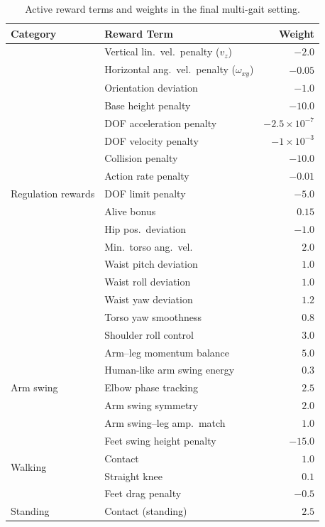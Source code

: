 \documentclass[letterpaper, 10 pt, conference]{ieeeconf}
\renewcommand{\arraystretch}{1.2}
\begin{document}
\begin{table}[h]
\centering
\caption{Active reward terms and weights in the final multi-gait setting.}
\label{tab:rewardweights}
\setlength{\tabcolsep}{6pt}
\renewcommand{\arraystretch}{1.05}
\begin{tabular}{llr}
\toprule
\textbf{Category} & \textbf{Reward Term} & \textbf{Weight} \\
\midrule
\multirow{17}{*}{Regulation rewards} 
& Vertical lin.\ vel.\ penalty ($v_z$) & $-2.0$ \\
& Horizontal ang.\ vel.\ penalty ($\omega_{xy}$) & $-0.05$ \\
& Orientation deviation & $-1.0$ \\
& Base height penalty & $-10.0$ \\
& DOF acceleration penalty & $-2.5\times10^{-7}$ \\
& DOF velocity penalty & $-1\times10^{-3}$ \\
& Collision penalty & $-10.0$ \\
& Action rate penalty & $-0.01$ \\
& DOF limit penalty & $-5.0$ \\
& Alive bonus & $0.15$ \\
& Hip pos.\ deviation & $-1.0$ \\
& Min.\ torso ang.\ vel. & $2.0$ \\
& Waist pitch deviation & $1.0$ \\
& Waist roll deviation & $1.0$ \\
& Waist yaw deviation & $1.2$ \\
& Torso yaw smoothness & $0.8$ \\
& Shoulder roll control & $3.0$ \\
\midrule
\multirow{5}{*}{Arm swing} 
& Arm--leg momentum balance & $5.0$ \\
& Human-like arm swing energy & $0.3$ \\
& Elbow phase tracking & $2.5$ \\
& Arm swing symmetry & $2.0$ \\
& Arm swing--leg amp.\ match & $1.0$ \\
\midrule
\multirow{4}{*}{Walking} 
& Feet swing height penalty & $-15.0$ \\
& Contact & $1.0$ \\
& Straight knee & $0.1$ \\
& Feet drag penalty & $-0.5$ \\
\midrule
\multirow{2}{*}{Standing} 
& Contact (standing) & $2.5$ \\

\end{tabular}
\end{table}
\end{document}
